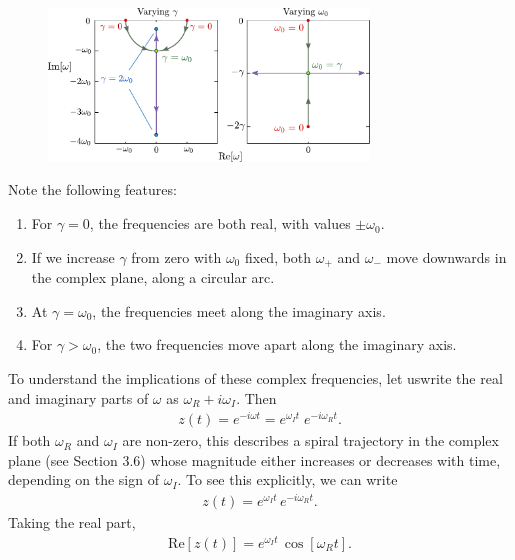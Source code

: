 \documentclass[10pt,a4paper]{article}
\begin{document}
\begin{figure}[ht]
  \centering\includegraphics[width=0.76\textwidth]{oscillator_frequencies}
\end{figure}

Note the following features:

\begin{enumerate}
\item For $\gamma = 0$, the frequencies are both real, with values
  $\pm \omega_0$.

\item If we increase $\gamma$ from zero with $\omega_0$ fixed, both
  $\omega_+$ and $\omega_-$ move downwards in the complex plane, along
  a circular arc.

\item At $\gamma = \omega_0$, the frequencies meet along the imaginary
  axis.

\item For $\gamma > \omega_0$, the two frequencies move apart along
  the imaginary axis.
\end{enumerate}

To understand the implications of these complex frequencies, let
uswrite the real and imaginary parts of $\omega$ as $\omega_R + i
\omega_I$.  Then
\begin{align}
  z(t) = e^{-i\omega t} = e^{\omega_I t} \; e^{-i\omega_R t}.
\end{align}
If both $\omega_R$ and $\omega_I$ are non-zero, this describes a
spiral trajectory in the complex plane (see Section 3.6) whose
magnitude either increases or decreases with time, depending on the
sign of $\omega_I$.  To see this explicitly, we can write
\begin{align}
  z(t) = e^{\omega_I t} \, e^{-i\omega_R t}.
\end{align}
Taking the real part,
\begin{align}
  \mathrm{Re}\left[z(t)\right] = e^{\omega_I t} \, \cos\left[\omega_R t\right].
  \label{eq:Rez}
\end{align}
\end{document}
